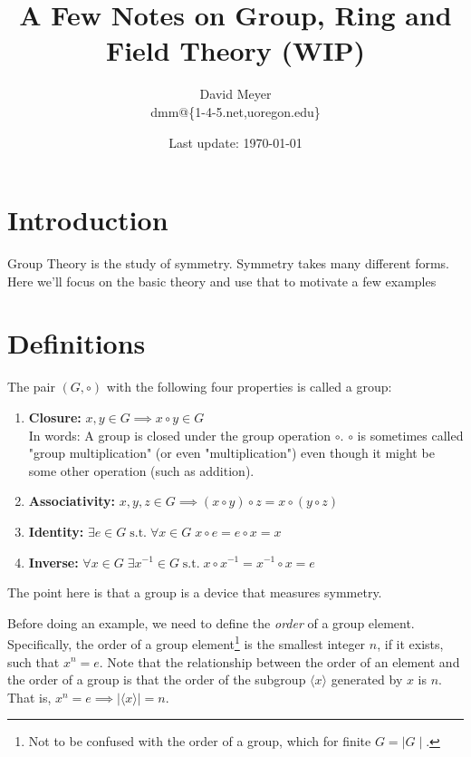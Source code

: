 \documentclass[11pt, oneside]{article}   	%
\title{A Few Notes on Group, Ring and Field Theory (WIP)}
\author{David Meyer \\ dmm@\{1-4-5.net,uoregon.edu\}}
\date{Last update: \today}							%
\theoremstyle{definition}
\begin{document}
\maketitle

\section{Introduction}
Group Theory is the study of symmetry. Symmetry takes many different forms. Here we'll focus on the basic theory and use that to motivate a 
few examples

\section{Definitions}
The pair $(G,\circ)$ with the following four properties is called a group:

\begin{enumerate}
\item \textbf{Closure:} $x, y \in G \implies x \circ y \in G$  \\
In words: A group is closed under the group operation $\circ$. $\circ$ is sometimes called "group multiplication" (or even "multiplication") even 
though it might be some other operation (such as addition).

\item \textbf{Associativity:} $x,y,z \in G \implies  (x \circ y) \circ z = x \circ (y \circ z)$

\item \textbf{Identity:} $\exists e \in G \;  \text{s.t.} \;  \forall x \in G \; x \circ e = e \circ x = x$

\item \textbf{Inverse:} $\forall x \in G \;  \exists x^{-1} \in G  \;  \text{s.t.} \;  x \circ x^{-1} = x^{-1} \circ x = e$
\end{enumerate}

\bigskip
\noindent
The point here is that a group is a device that measures symmetry. 

\bigskip
\noindent
Before doing an example, we need to define the \emph{order} of a group
element. Specifically, the order of a group element\footnote{Not to be confused with the order of a group, which for finite $G = \mid G \mid$.}
is the smallest integer $n$, if it exists, such that  $x^n = e$. Note that the relationship between the order of an element and the order of a 
group is that the order of the subgroup $\langle x \rangle$ generated by $x$ is $n$. That is, $x^n = e \implies | \langle x \rangle | = n$.
\end{document}
